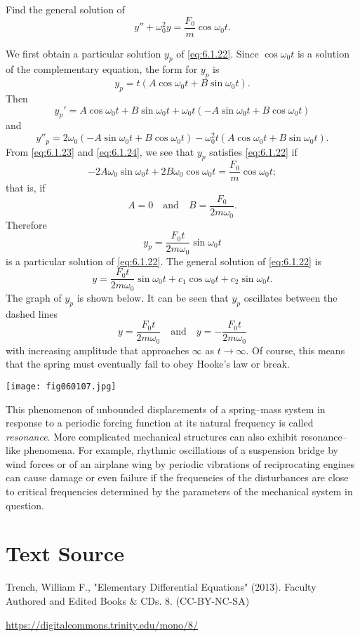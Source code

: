 \documentclass{ximera}
\begin{document}
 
 
\begin{example}\label{example:6.1.5}
Find the general solution of
\begin{equation}\label{eq:6.1.22}
y''+\omega_0^2y=\frac{F_0}{m}\cos\omega_0t.
\end{equation}
 
\begin{explanation}
We first obtain a particular solution $y_p$ of \eqref{eq:6.1.22}. Since
$\cos\omega_0t$ is a solution of the complementary equation, the form
for $y_p$ is
\begin{equation}\label{eq:6.1.23}
y_p=t(A\cos\omega_0t+B\sin\omega_0t).
\end{equation}
 Then
$$
y_p'=A\cos\omega_0t+B\sin\omega_0t
+\omega_0t(-A\sin\omega_0t+B\cos\omega_0t)
$$
and
\begin{equation}\label{eq:6.1.24}
y''_p=2\omega_0(-A\sin\omega_0t
+B\cos\omega_0t)-\omega_0^2t(A\cos\omega_0t+B\sin\omega_0t).
\end{equation}
From \eqref{eq:6.1.23} and \eqref{eq:6.1.24}, we see that $y_p$ satisfies
\eqref{eq:6.1.22} if
$$
-2A\omega_0\sin\omega_0t+2B\omega_0\cos\omega_0t=\frac{F_0}{m}
\cos\omega_0t;
$$
that is, if
$$
A=0\quad\mbox{and}\quad B=\frac{F_0}{2m\omega_0}.
$$
Therefore
$$
y_p=\frac{F_0t}{2m\omega_0}\sin\omega_0t
$$
is a particular solution of \eqref{eq:6.1.22}. The general solution of
 \eqref{eq:6.1.22} is
$$
y=\frac{F_0t}{2m\omega_0}\sin\omega_0t+c_1\cos\omega_0t+c_2\sin\omega_0t.
$$
The graph of $y_p$ is shown below.  It can be
seen that $y_p$ oscillates between the dashed lines
$$
y=\frac{F_0t}{2m\omega_0}\quad\mbox{and}\quad y=-\frac{F_0t}{2m\omega_0}
$$
with increasing amplitude that approaches $\infty$ as $t\rightarrow\infty$. Of
course, this means that the spring must eventually fail to obey Hooke's law
or break.
\begin{image}
  \texttt{[image: fig060107.jpg]}
\end{image}
\end{explanation}
\end{example}
 
 
 
This phenomenon of unbounded displacements of a spring--mass system in
response to a periodic forcing function at its natural
frequency is called \textit{resonance}. More complicated mechanical
structures can also exhibit resonance--like phenomena. For example,
rhythmic oscillations of a suspension bridge by wind forces or of an
airplane wing by periodic vibrations of reciprocating engines can
cause damage or even failure if the frequencies of the disturbances
are close to critical frequencies determined by the parameters of the
mechanical system in question.
 
\section*{Text Source}
Trench, William F., "Elementary Differential Equations" (2013). Faculty Authored and Edited Books \& CDs. 8. (CC-BY-NC-SA)
 
\href{https://digitalcommons.trinity.edu/mono/8/}{https://digitalcommons.trinity.edu/mono/8/}
 
\end{document}
